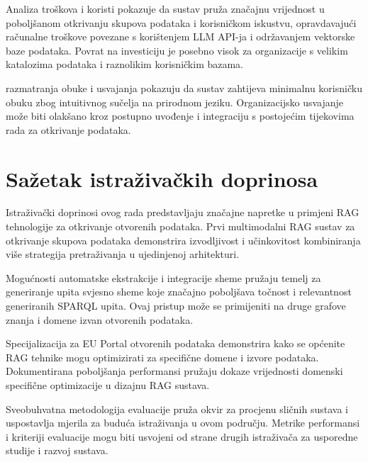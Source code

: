 Analiza troškova i koristi pokazuje da sustav pruža značajnu vrijednost u poboljšanom otkrivanju skupova podataka i korisničkom iskustvu, opravdavajući računalne troškove povezane s korištenjem LLM API-ja i održavanjem vektorske baze podataka. Povrat na investiciju je posebno visok za organizacije s velikim katalozima podataka i raznolikim korisničkim bazama.

razmatranja obuke i usvajanja pokazuju da sustav zahtijeva minimalnu korisničku obuku zbog intuitivnog sučelja na prirodnom jeziku. Organizacijsko usvajanje može biti olakšano kroz postupno uvođenje i integraciju s postojećim tijekovima rada za otkrivanje podataka.

\section{Sažetak istraživačkih doprinosa}
\label{sec:research_contributions}

Istraživački doprinosi ovog rada predstavljaju značajne napretke u primjeni RAG tehnologije za otkrivanje otvorenih podataka. Prvi multimodalni RAG sustav za otkrivanje skupova podataka demonstrira izvodljivost i učinkovitost kombiniranja više strategija pretraživanja u ujedinjenoj arhitekturi.

Mogućnosti automatske ekstrakcije i integracije sheme pružaju temelj za generiranje upita svjesno sheme koje značajno poboljšava točnost i relevantnost generiranih SPARQL upita. Ovaj pristup može se primijeniti na druge grafove znanja i domene izvan otvorenih podataka.

Specijalizacija za EU Portal otvorenih podataka demonstrira kako se općenite RAG tehnike mogu optimizirati za specifične domene i izvore podataka. Dokumentirana poboljšanja performansi pružaju dokaze vrijednosti domenski specifične optimizacije u dizajnu RAG sustava.

Sveobuhvatna metodologija evaluacije pruža okvir za procjenu sličnih sustava i uspostavlja mjerila za buduća istraživanja u ovom području. Metrike performansi i kriteriji evaluacije mogu biti usvojeni od strane drugih istraživača za usporedne studije i razvoj sustava. 